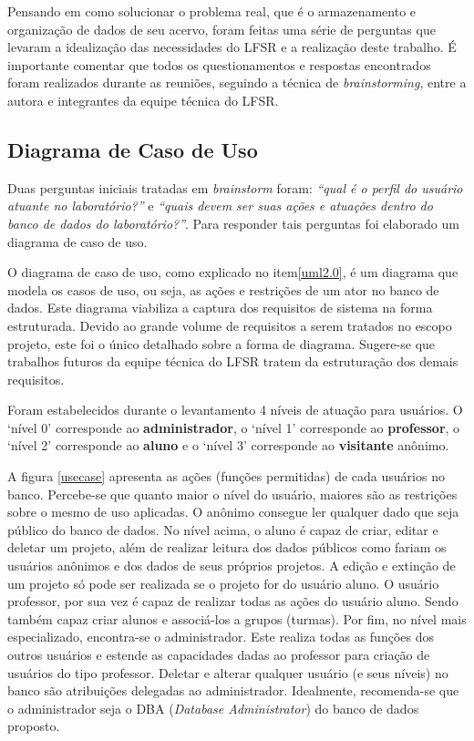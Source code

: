 Pensando em como solucionar o problema real, que é o armazenamento e organização de dados de seu acervo, foram feitas uma série de perguntas que levaram a idealização das necessidades do LFSR e a realização deste trabalho. É importante comentar que todos os questionamentos e respostas encontrados foram realizados durante as reuniões, seguindo a técnica de \textit{brainstorming}, entre a autora e integrantes da equipe técnica do LFSR.


\subsection{Diagrama de Caso de Uso}

Duas perguntas iniciais tratadas em \textit{brainstorm} foram: \textit{``qual é o perfil do usuário atuante no laboratório?''} e \textit{``quais devem ser suas ações e atuações dentro do banco de dados do laboratório?''}. Para responder tais perguntas foi elaborado um diagrama de caso de uso.

O diagrama de caso de uso, como explicado no item\ref{uml2.0}, é um diagrama que modela os casos de uso, ou seja, as ações e restrições de um ator no banco de dados. Este diagrama viabiliza a captura dos requisitos de sistema na forma estruturada. Devido ao grande volume de requisitos a serem tratados no escopo projeto, este foi o único detalhado sobre a forma de diagrama. Sugere-se que trabalhos futuros da equipe técnica do LFSR tratem da estruturação dos demais requisitos.

Foram estabelecidos durante o levantamento 4 níveis de atuação para usuários. O `nível 0' corresponde ao \textbf{administrador}, o `nível 1' corresponde ao \textbf{professor}, o `nível 2' corresponde ao \textbf{aluno} e o `nível 3' corresponde ao \textbf{visitante} anônimo.

A figura \ref{usecase} apresenta as ações (funções permitidas) de cada usuários no banco. Percebe-se que quanto maior o nível do usuário, maiores são as restrições sobre o mesmo de uso aplicadas. O anônimo consegue ler qualquer dado que seja público do banco de dados. No nível acima, o aluno é capaz de criar, editar e deletar um projeto, além de realizar leitura dos dados públicos como fariam os usuários anônimos e dos dados de seus próprios projetos. A edição e extinção de um projeto só pode ser realizada se o projeto for do usuário aluno. O usuário professor, por sua vez é capaz de realizar todas as ações do usuário aluno. Sendo também capaz criar alunos e associá-los a grupos (turmas). Por fim, no nível mais especializado, encontra-se o administrador. Este realiza todas as funções dos outros usuários e estende as capacidades dadas ao professor para criação de usuários do tipo professor. Deletar e alterar qualquer usuário (e seus níveis) no banco são atribuições delegadas ao administrador. Idealmente, recomenda-se que o administrador seja o DBA (\textit{Database Administrator}) do banco de dados proposto.

